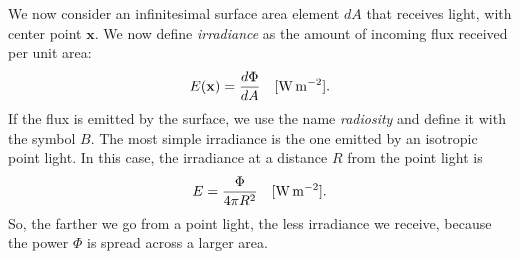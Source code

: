 We now consider an infinitesimal surface area element $dA$ that receives light, with center point $\mathbf{x}$. We now define \emph{irradiance} as the amount of incoming flux received per unit area:
\begin{equation*}
E(\mathbf{x}) = \frac{d \Phi}{d A}  \ \ \ [\SI{}{\watt \per \square \metre}].
\end{equation*}
If the flux is emitted by the surface, we use the name \emph{radiosity} and define it with the symbol $B$.
The most simple irradiance is the one emitted by an isotropic point light. In this case, the irradiance at a distance $R$ from the point light is 
\begin{equation*}
E = \frac{\Phi}{4 \pi R^2} \ \ \ [\SI{}{\watt \per \square \metre}].
\end{equation*}
So, the farther we go from a point light, the less irradiance we receive, because the power $\Phi$ is spread across a larger area.

